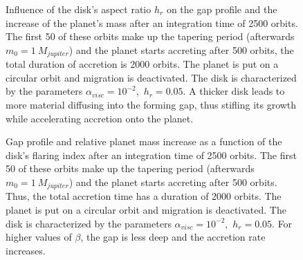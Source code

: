       \newpage
      \begin{figure}[h!]
        \centering
        \begin{minipage}{.5\linewidth}
          \centering
        \end{minipage}%
        \begin{minipage}{.5\linewidth}
          \centering
        \end{minipage}
      \caption{
        Influence of the disk's aspect ratio $h_r$ on the gap profile and
        the increase of the planet's mass after an integration time of 2500 
        orbits. The first 50 of these orbits make up the tapering 
        period (afterwards $m_0=1\ M_{jupiter}$) and the planet starts accreting 
        after 500 orbits, the total duration of accretion is
        2000 orbits. The planet is put on a circular orbit and migration is
        deactivated. The disk is characterized by the parameters 
        $\alpha_{visc}=10^{-2}$,\ $h_r=0.05$. 
        A thicker disk leads to more 
        material diffusing into the forming gap, thus stifling its growth 
        while accelerating accretion onto the planet.
        }
        \label{fig:varying_aspect_ratio}
      \end{figure}

      \begin{figure}[h!]
        \centering
        \begin{minipage}{.5\linewidth}
          \centering
        \end{minipage}%
        \begin{minipage}{.5\linewidth}
          \centering
        \end{minipage}
      \caption{
        Gap profile and relative planet mass increase as a function of 
        the disk's flaring index after an integration time of 2500 orbits. The 
        first 50 of these orbits make up the tapering 
        period (afterwards $m_0=1\ M_{jupiter}$) and the planet starts accreting 
        after 500 orbits. Thus, the total accretion time has a duration of 
        2000 orbits. The planet is put on a circular orbit and migration is
        deactivated. The disk is characterized by the parameters 
        $\alpha_{visc}=10^{-2}$,\ $h_r=0.05$.
        For higher values of 
        $\beta$, the gap is less deep and the accretion rate increases.
      }
      \label{fig:varying_flaring_index}
      \end{figure} 

